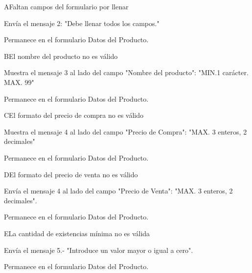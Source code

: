 \begin{UCtrayectoriaA}{A}{Faltan campos del formulario por llenar}
	
	\UCpaso[\UCsist] Envía el mensaje 2: "Debe llenar todos los campos."

	\UCpaso[] Permanece en el formulario Datos del Producto.

\end{UCtrayectoriaA}
\begin{UCtrayectoriaA}{B}{El nombre del producto no es válido}
	
	\UCpaso[\UCsist] Muestra el mensaje 3 al lado del campo "Nombre del producto": "MIN.1 carácter. MAX. 99"

	\UCpaso[] Permanece en el formulario Datos del Producto.

\end{UCtrayectoriaA}
\begin{UCtrayectoriaA}{C}{El formato del precio de compra no es válido}
	
	\UCpaso[\UCsist] Muestra el mensaje 4 al lado del campo "Precio de Compra": "MAX. 3 enteros, 2 decimales"

	\UCpaso[] Permanece en el formulario Datos del Producto.

\end{UCtrayectoriaA}
\begin{UCtrayectoriaA}{D}{El formato del precio de venta no es válido}
	
	\UCpaso[\UCsist] Envía el mensaje 4 al lado del campo "Precio de Venta": "MAX. 3 enteros, 2 decimales".

	\UCpaso[] Permanece en el formulario Datos del Producto.

\end{UCtrayectoriaA}
\begin{UCtrayectoriaA}{E}{La cantidad de existencias mínima no es válida}
	
	\UCpaso[\UCsist] Envía el mensaje 5.- "Introduce un valor mayor o igual a cero".	

	\UCpaso[] Permanece en el formulario Datos del Producto.

\end{UCtrayectoriaA}

